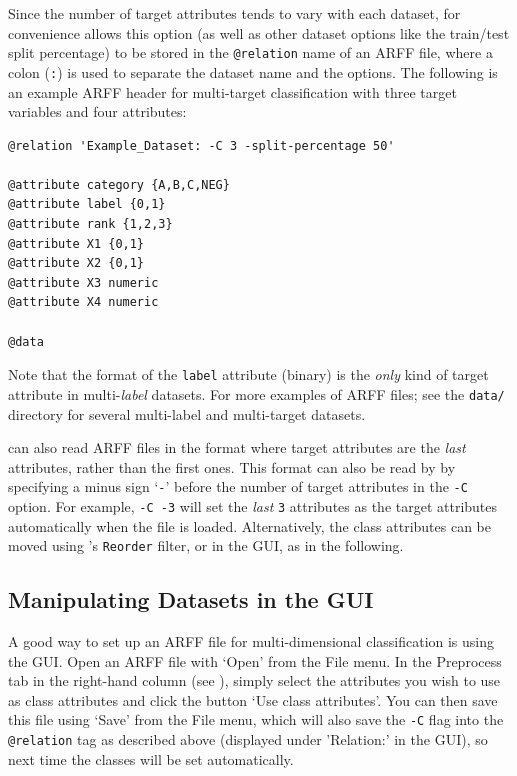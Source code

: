 \documentclass[11pt]{article}
\newcommand{\MEKA}{Meka}
\newcommand{\WEKA}{Weka}
\newcommand{\MULAN}{Mulan}
\begin{document}
Since the number of target attributes tends to vary with each dataset, for convenience \framework{\MEKA} allows this option (as well as other dataset options like the train/test split percentage) to be stored in the \texttt{@relation} name of an ARFF file, where a colon (\texttt{:}) is used to separate the dataset name and the options. The following is an example ARFF header for multi-target classification with three target variables and four attributes:

{\small
\begin{verbatim}
@relation 'Example_Dataset: -C 3 -split-percentage 50'

@attribute category {A,B,C,NEG}
@attribute label {0,1}
@attribute rank {1,2,3}
@attribute X1 {0,1}
@attribute X2 {0,1}
@attribute X3 numeric
@attribute X4 numeric

@data
\end{verbatim}
}

Note that the format of the \texttt{label} attribute (binary) is the \emph{only} kind of target attribute in multi-\emph{label} datasets. For more examples of \framework{\MEKA} ARFF files; see the \texttt{data/} directory for several multi-label and multi-target datasets.

\framework{\MEKA} can also read ARFF files in the \framework{\MULAN} format where target attributes are the \emph{last} attributes, rather than the first ones. This format can also be read by \framework{\MEKA} by specifying a minus sign `\texttt{-}' before the number of target attributes in the \texttt{-C} option. For example, \texttt{-C -3} will set the \emph{last} \texttt{3} attributes as the target attributes automatically when the file is loaded. Alternatively, the class attributes can be moved using \framework{\WEKA}'s \texttt{Reorder} filter, or in the GUI, as in the following. %


\subsection{Manipulating Datasets in the GUI}
\label{sec:data.gui}

A good way to set up an ARFF file for multi-dimensional classification is using the GUI. Open an ARFF file with `\textsf{Open}' from the \textsf{File} menu. In the \textsf{Preprocess} tab in the right-hand column (see ), simply select the attributes you wish to use as class attributes and click the button `\textsf{Use class attributes}'. You can then save this file using `\textsf{Save}' from the \textsf{File} menu, which will also save the \texttt{-C} flag into the \texttt{@relation} tag as described above (displayed under '\textsf{Relation:}' in the GUI), so next time the classes will be set automatically.
\end{document}
